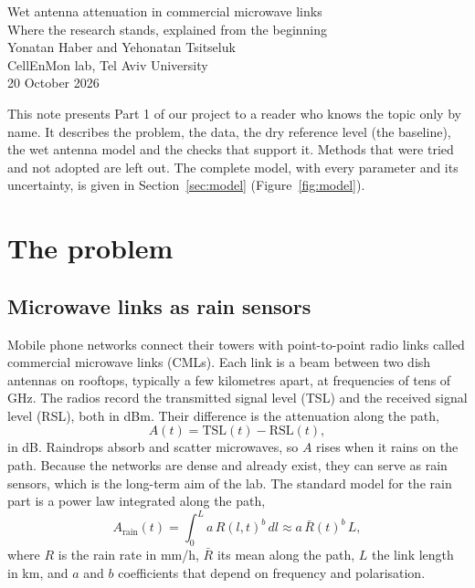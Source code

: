 \documentclass[11pt,a4paper]{article}
\newcommand{\Rb}{\bar{R}}
\begin{document}
\begin{center}
{\LARGE\sffamily Wet antenna attenuation in commercial microwave links}\\[0.4em]
{\large\sffamily Where the research stands, explained from the beginning}\\[0.8em]
Yonatan Haber and Yehonatan Tsitseluk\\
CellEnMon lab, Tel Aviv University\\
20 October 2026
\end{center}

This note presents Part 1 of our project to a reader who knows the topic only by name. It describes the problem, the data,
the dry reference level (the baseline), the wet antenna model and the checks that support it. Methods that were tried and
not adopted are left out. The complete model, with every parameter and its uncertainty, is given in Section~\ref{sec:model}
(Figure~\ref{fig:model}).

\section{The problem}

\subsection{Microwave links as rain sensors}
Mobile phone networks connect their towers with point-to-point radio links called commercial microwave links (CMLs). Each
link is a beam between two dish antennas on rooftops, typically a few kilometres apart, at frequencies of tens of GHz. The
radios record the transmitted signal level (TSL) and the received signal level (RSL), both in dBm. Their difference is the
attenuation along the path,
\begin{equation}
A(t) = \mathrm{TSL}(t) - \mathrm{RSL}(t),
\label{eq:A}
\end{equation}
in dB. Raindrops absorb and scatter microwaves, so $A$ rises when it rains on the path. Because the networks are dense and
already exist, they can serve as rain sensors, which is the long-term aim of the lab. The standard model for the rain part is
a power law integrated along the path,
\begin{equation}
A_{\mathrm{rain}}(t) = \int_0^L a\,R(l,t)^b\,dl \approx a\,\Rb(t)^b\,L,
\label{eq:powerlaw}
\end{equation}
where $R$ is the rain rate in mm/h, $\Rb$ its mean along the path, $L$ the link length in km, and $a$ and $b$ coefficients that
depend on frequency and polarisation.
\end{document}
